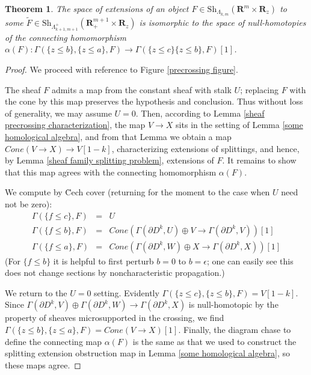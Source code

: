 \documentclass[12pt,a4paper]{article}
\numberwithin{equation}{section}
\newtheorem{theorem}[equation]{Theorem}
\theoremstyle{definition}
\theoremstyle{remark}
\newcommand{\R}{\mathbf{R}}
\newcommand{\Sh}{\mathrm{Sh}}
\begin{document}
\begin{theorem} \label{sheaf crossing obstruction}
    The space of extensions of an object $F \in \Sh_{\Lambda_{k,m}}(\R^m  \times  \R_z)$ to some $\widetilde{F} \in \Sh_{\Lambda_{k+1,m+1}^+}(\R^{m+1}_+  \times  \R_z)$
    is isomorphic to the space of null-homotopies of the connecting homomorphism
    $\alpha(F): \Gamma(\{z \le b\}, \{z \le a\}, F) \to \Gamma(\{z \le c\} \{z \le b\}, F)[1]$.
\end{theorem}
\begin{proof}
    We proceed with reference to Figure \ref{precrossing figure}.

    The sheaf $F$ admits a map from the constant sheaf with stalk $U$; replacing $F$ with the cone by this map preserves the hypothesis and conclusion.  Thus without loss of generality, we may assume $U = 0$.  Then, according to Lemma \ref{sheaf precrossing characterization}, the map $V \to X$ sits in the setting of Lemma \ref{some homological algebra}, and from that Lemma we obtain a map $Cone(V \to X) \to V[1-k]$, characterizing extensions of splittings, and hence, by Lemma \ref{sheaf family splitting problem}, extensions of $F$.  It remains to show that this map agrees with the connecting homomorphism $\alpha(F)$.

    We compute by \u Cech cover (returning for the moment to the case when $U$ need not be zero):
    \begin{eqnarray*}
    \Gamma(\{f \le c\}, F) & = & U \\
    \Gamma(\{f \le b\}, F) & = & Cone(\Gamma(\partial D^k, U) \oplus V \to  \Gamma(\partial D^k, V))[1] \\
    \Gamma(\{f \le a\}, F) & = & Cone(\Gamma(\partial D^k, W) \oplus X \to \Gamma(\partial D^k, X))[1]
    \end{eqnarray*}
    (For $\{f \le b\}$ it is helpful to first perturb $b = 0$ to $b = \epsilon$; one can easily see this does not change sections by noncharacteristic propagation.)

    We return to the $U=0$ setting.  Evidently
    $\Gamma(\{z \le c\}, \{z \le b\}, F) = V[1-k]$.  Since
    $\Gamma(\partial D^k, V) \oplus \Gamma(\partial D^k, W) \to \Gamma(\partial D^k, X)$ is null-homotopic by the property of sheaves microsupported in the crossing, we find  $\Gamma(\{z \le b\}, \{z \le a\}, F) = Cone(V \to X)[1]$. Finally, the diagram chase to define the connecting map
    $\alpha(F)$ is  the same as that we used to construct the splitting extension obstruction map in Lemma \ref{some homological algebra}, so these maps agree.
\end{proof}
\end{document}
